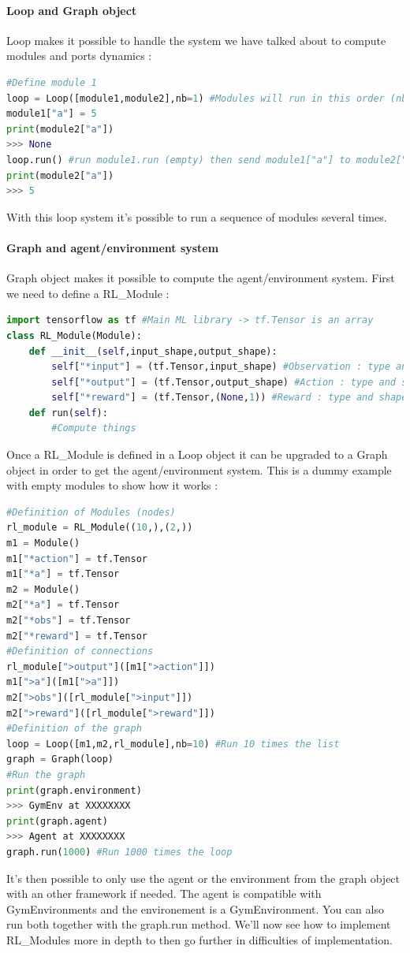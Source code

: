 \documentclass[11pt]{article}
\begin{document}
\paragraph{Loop and Graph object}
Loop makes it possible to handle the system we have talked about to compute modules and ports dynamics :
\begin{lstlisting}[language=Python]
#Define module 1
loop = Loop([module1,module2],nb=1) #Modules will run in this order (nb=1 iteration of the loop)
module1["a"] = 5
print(module2["a"])
>>> None
loop.run() #run module1.run (empty) then send module1["a"] to module2["a"] and run module2.run() (empty)
print(module2["a"])
>>> 5
\end{lstlisting}
With this loop system it's possible to run a sequence of modules several times.
\paragraph{Graph and agent/environment system}
Graph object makes it possible to compute the agent/environment system. First we need to define a RL\_Module :
\begin{lstlisting}[language=Python]
import tensorflow as tf #Main ML library -> tf.Tensor is an array
class RL_Module(Module):
	def __init__(self,input_shape,output_shape):
		self["*input"] = (tf.Tensor,input_shape) #Observation : type and shape
		self["*output"] = (tf.Tensor,output_shape) #Action : type and shape
		self["*reward"] = (tf.Tensor,(None,1)) #Reward : type and shape
	def run(self):
		#Compute things
\end{lstlisting}
Once a RL\_Module is defined in a Loop object it can be upgraded to a Graph object in order to get the agent/environment system. This is a dummy example with empty modules to show how it works :
\begin{lstlisting}[language=Python]
#Definition of Modules (nodes)
rl_module = RL_Module((10,),(2,))
m1 = Module()
m1["*action"] = tf.Tensor
m1["*a"] = tf.Tensor
m2 = Module()
m2["*a"] = tf.Tensor
m2["*obs"] = tf.Tensor
m2["*reward"] = tf.Tensor
#Definition of connections
rl_module[">output"]([m1[">action"]])
m1[">a"]([m1[">a"]])
m2[">obs"]([rl_module[">input"]])
m2[">reward"]([rl_module[">reward"]])
#Definition of the graph
loop = Loop([m1,m2,rl_module],nb=10) #Run 10 times the list
graph = Graph(loop)
#Run the graph
print(graph.environment)
>>> GymEnv at XXXXXXXX
print(graph.agent)
>>> Agent at XXXXXXXX
graph.run(1000) #Run 1000 times the loop
\end{lstlisting}
It's then possible to only use the agent or the environment from the graph object with an other framework if needed. The agent is compatible with GymEnvironments and the environement is a GymEnvironment. You can also run both together with the graph.run method. We'll now see how to implement RL\_Modules more in depth to then go further in difficulties of implementation.
\end{document}
